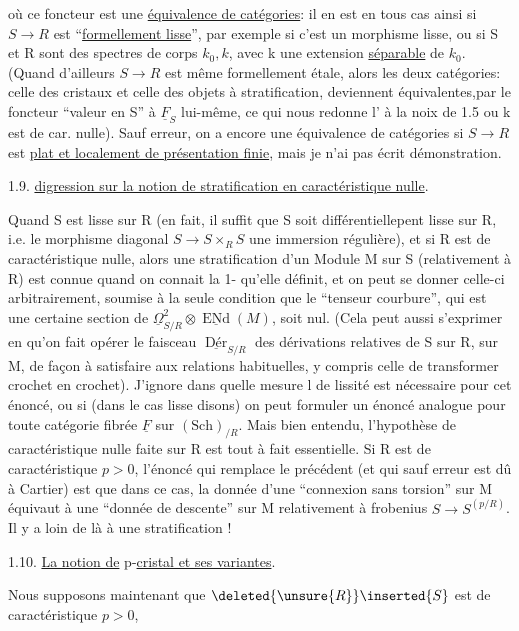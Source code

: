 
où ce foncteur est une \uline{équivalence de catégories}: il en est en tous cas ainsi si $S\longrightarrow R$ est ``\uline{formellement lisse}'', par exemple si c'est un morphisme lisse, ou si S et R sont des spectres de corps $k_0,k$, avec k une extension \uline{séparable} de $k_0$. (Quand d'ailleurs $S\to R$ est même formellement étale, alors les deux catégories: celle des cristaux et celle des objets à stratification, deviennent  équivalentes,par le foncteur ``valeur en S''\inserted{,} à $\underline F_S$ lui-même, ce qui nous redonne l' à la noix de 1.5 ou k est de car. nulle). Sauf erreur, on a encore une équivalence de catégories si $S\to R$ est \uline{plat et localement de présentation finie},  mais je n'ai pas écrit  démonstration.

1.9. \uline{ digression sur la notion de stratification en caractéristique nulle}.

Quand S est lisse sur R (en fait, il suffit que S soit différentiellepent lisse sur R, i.e. le morphisme diagonal $S\to S\times_RS$ une immersion régulière), et si R est de caractéristique nulle, alors une stratification d'un Module M sur S (relativement à R) est connue quand on connait la 1- qu'elle définit, et on peut se donner celle-ci arbitrairement, soumise à la seule condition que le ``tenseur courbure'', qui est une certaine section de $\underline\Omega^2_{S/R}\otimes\underline{\operatorname{ENd}}(M)$, soit nul. (Cela peut aussi s'exprimer en  qu'on fait opérer le faisceau $\underline{\operatorname{Dér}}_{S/R}$ des dérivations relatives de S sur R, sur M, de façon à satisfaire aux relations habituelles, y compris celle de transformer crochet en crochet). J'ignore dans quelle mesure l  de lissité est nécessaire pour cet énoncé, ou si (dans le cas lisse disons) on peut formuler un énoncé analogue pour toute catégorie fibrée $\underline F$ sur $(\mathrm{Sch})_{/R}$. Mais bien entendu, l'hypothèse de caractéristique nulle faite sur R est tout à fait essentielle. Si R est de caractéristique $p>0$, l'énoncé qui remplace le précédent (et qui sauf erreur est dû à Cartier) est que dans ce cas, la donnée d'une ``connexion sans torsion'' sur M  équivaut à une ``donnée de descente'' sur M relativement à frobenius $S\longrightarrow S^{(p/R)}$. Il y a loin de là à une  stratification !

1.10. \uline{La notion de} p-\uline{cristal et ses variantes}.

Nous supposons maintenant que $\deleted{\unsure{R}}\inserted{S}$ est de caractéristique $p>0$, 
